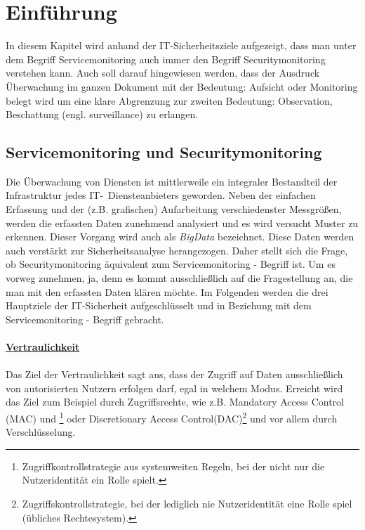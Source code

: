 \chapter{Einführung}\label{01_einf}
\thispagestyle{fancy}

In diesem Kapitel wird anhand der IT-Sicherheitsziele aufgezeigt, dass man unter dem 
Begriff Servicemonitoring auch immer den Begriff Securitymonitoring verstehen
kann. Auch soll darauf hingewiesen werden, dass der Ausdruck Überwachung im ganzen
Dokument mit der Bedeutung: Aufsicht oder Monitoring belegt wird um eine klare Abgrenzung
zur zweiten Bedeutung: Observation, Beschattung (engl. surveillance) zu erlangen.


\section{Servicemonitoring und Securitymonitoring}

Die Überwachung von Diensten ist mittlerweile ein integraler Bestandteil der 
Infrastruktur jedes IT-~Diensteanbieters geworden. Neben der einfachen Erfassung
und der (z.B. grafischen) Aufarbeitung verschiedenster Messgrößen, werden die erfassten 
Daten zunehmend analysiert und es wird versucht Muster zu erkennen. Dieser Vorgang wird 
auch als \textit{BigData} bezeichnet. Diese Daten werden auch verstärkt zur 
Sicherheitsanalyse herangezogen. Daher stellt sich die Frage, ob Securitymonitoring 
äquivalent zum Servicemonitoring - Begriff ist. Um es vorweg zunehmen, ja, denn es kommt 
ausschließlich auf die Fragestellung an, die man mit den erfassten Daten klären möchte. 
Im Folgenden werden die drei Hauptziele der IT-Sicherheit aufgeschlüsselt und in 
Beziehung mit dem Servicemonitoring - Begriff gebracht.\\\\

\underline{\textbf{Vertraulichkeit}}\\\\
Das Ziel der Vertraulichkeit sagt aus, dass der Zugriff auf Daten ausschließlich von
autorisierten Nutzern erfolgen darf, egal in welchem Modus. Erreicht wird das Ziel zum
Beispiel durch Zugriffsrechte, wie z.B. Mandatory Access Control (MAC) und 
\footnote{Zugriffkontrollstrategie aus systemweiten Regeln, 
bei der nicht nur die Nutzeridentität ein Rolle spielt.} oder Discretionary Access 
Control(DAC)\footnote{Zugriffskontrollstrategie, bei der lediglich nie Nutzeridentität 
eine Rolle spiel (übliches Rechtesystem).} und vor allem durch Verschlüsselung.\\

